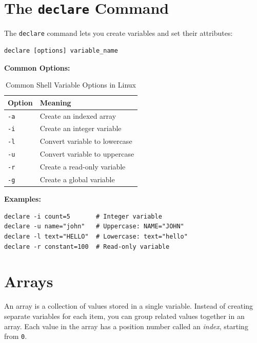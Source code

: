 \section{The \texttt{declare} Command}
The \texttt{declare} command lets you create variables and set their attributes:
\begin{lstlisting}[language=Terminal]
declare [options] variable_name
\end{lstlisting}

\textbf{Common Options:}
\begin{table}[h!]
\centering
\small
\renewcommand{\arraystretch}{1.3}
\begin{tabular}{|>{\centering\arraybackslash}p{2cm}|>{\raggedright\arraybackslash}p{10cm}|}
\hline
\textbf{Option} & \textbf{Meaning} \\ \hline
\texttt{-a} & Create an indexed array \\ \hline
\texttt{-i} & Create an integer variable \\ \hline
\texttt{-l} & Convert variable to lowercase \\ \hline
\texttt{-u} & Convert variable to uppercase \\ \hline
\texttt{-r} & Create a read-only variable \\ \hline
\texttt{-g} & Create a global variable \\ \hline
\end{tabular}
\caption{Common Shell Variable Options in Linux}
\label{tab:declare-options}
\end{table}

\textbf{Examples:}
\begin{lstlisting}[language=Terminal]
declare -i count=5       # Integer variable
declare -u name="john"   # Uppercase: NAME="JOHN"
declare -l text="HELLO"  # Lowercase: text="hello"
declare -r constant=100  # Read-only variable
\end{lstlisting}

\section{Arrays}
An array is a collection of values stored in a single variable. Instead of creating separate variables for each item, you can group related values together in an array. Each value in the array has a position number called an \emph{index}, starting from \texttt{0}.

